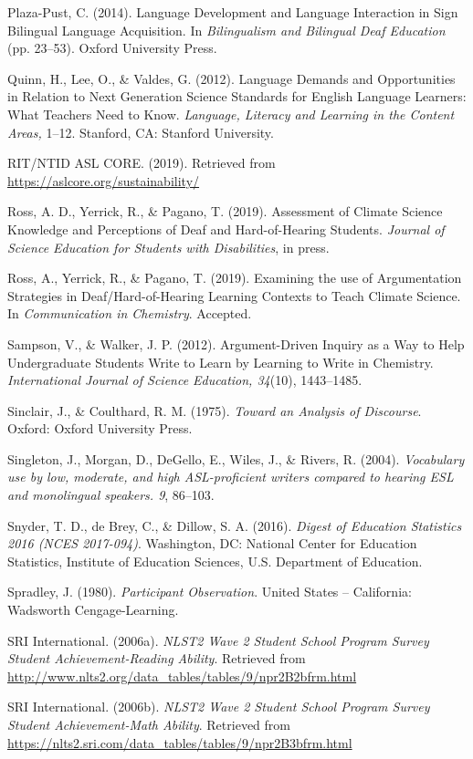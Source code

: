 \documentclass[11.5pt]{sig-alternate} %
\begin{document}
\begin{hangparas}{0.25in}{1}
Plaza-Pust, C. (2014). Language Development and Language Interaction in Sign Bilingual Language Acquisition. In \textit{Bilingualism and Bilingual Deaf Education} (pp. 23–53). Oxford University Press.

Quinn, H., Lee, O., \& Valdes, G. (2012). Language Demands and Opportunities in Relation to Next Generation Science Standards for English Language Learners: What Teachers Need to Know.\textit{ Language, Literacy and Learning in the Content Areas,} 1–12. Stanford, CA: Stanford University.

RIT/NTID ASL CORE. (2019). Retrieved from \url{https://aslcore.org/sustainability/}

Ross, A. D., Yerrick, R., \& Pagano, T. (2019). Assessment of Climate Science Knowledge and Perceptions of Deaf and Hard-of-Hearing Students. \textit{Journal of Science Education for Students with Disabilities}, in press.

Ross, A., Yerrick, R., \& Pagano, T. (2019). Examining the use of Argumentation Strategies in Deaf/Hard-of-Hearing Learning Contexts to Teach Climate Science. In \textit{Communication in Chemistry}. Accepted.

Sampson, V., \& Walker, J. P. (2012). Argument-Driven Inquiry as a Way to Help Undergraduate Students Write to Learn by Learning to Write in Chemistry. \textit{International Journal of Science Education, 34}(10), 1443–1485. 

Sinclair, J., \& Coulthard, R. M. (1975). \textit{Toward an Analysis of Discourse}. Oxford: Oxford University Press.

Singleton, J., Morgan, D., DeGello, E., Wiles, J., \& Rivers, R. (2004). \textit{Vocabulary use by low, moderate, and high ASL-proficient writers compared to hearing ESL and monolingual speakers. 9}, 86–103.

Snyder, T. D., de Brey, C., \& Dillow, S. A. (2016). \textit{Digest of Education Statistics 2016 (NCES 2017-094)}. Washington, DC: National Center for Education Statistics, Institute of Education Sciences, U.S. Department of Education.

Spradley, J. (1980). \textit{Participant Observation}. United States -- California: Wadsworth Cengage-Learning.

SRI International. (2006a). \textit{NLST2 Wave 2 Student School Program Survey Student Achievement-Reading Ability}. Retrieved from \url{http://www.nlts2.org/data\_tables/tables/9/npr2B2bfrm.html}

SRI International. (2006b). \textit{NLST2 Wave 2 Student School Program Survey Student Achievement-Math Ability}. Retrieved from \url{https://nlts2.sri.com/data\_tables/tables/9/npr2B3bfrm.html}


\end{hangparas}
\end{document}
